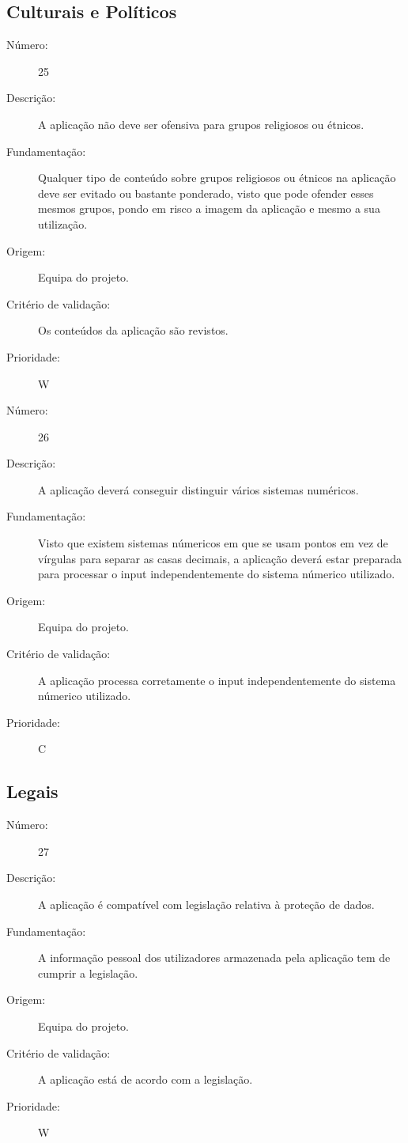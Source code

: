 \documentclass{article}
\begin{document}
  \subsection{Culturais e Políticos}

            \begin{description}
        \item[Número:]25
        \item[Descrição:]A aplicação não deve ser ofensiva para grupos religiosos ou étnicos.
        \item[Fundamentação:]Qualquer tipo de conteúdo sobre grupos religiosos ou étnicos na aplicação deve ser evitado ou bastante ponderado, visto que pode ofender esses mesmos grupos, pondo em risco a imagem da aplicação e mesmo a sua utilização.
        \item[Origem:]Equipa do projeto.
        \item[Critério de validação:]Os conteúdos da aplicação são revistos.
        \item[Prioridade:]W
      \end{description}
      \vspace{0.5cm}

            \begin{description}
        \item[Número:]26
        \item[Descrição:]A aplicação deverá conseguir distinguir vários sistemas numéricos.
        \item[Fundamentação:]Visto que existem sistemas númericos em que se usam pontos em vez de vírgulas para separar as casas decimais, a aplicação deverá estar preparada para processar o input independentemente do sistema númerico utilizado.
        \item[Origem:]Equipa do projeto.
        \item[Critério de validação:]A aplicação processa corretamente o input independentemente do sistema númerico utilizado.
        \item[Prioridade:]C
      \end{description}

  \subsection{Legais}

            \begin{description}
        \item[Número:]27
        \item[Descrição:] A aplicação é compatível com legislação relativa à proteção de dados.
        \item[Fundamentação:]A informação pessoal dos utilizadores armazenada pela aplicação tem de cumprir a legislação.
        \item[Origem:]Equipa do projeto.
        \item[Critério de validação:]A aplicação está de acordo com a legislação.
        \item[Prioridade:]W
      \end{description}
\newpage
\end{document}
